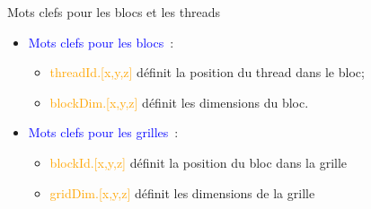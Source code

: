\documentclass[handout,francais]{beamer}
\begin{document}
\begin{frame}[containsverbatim]{Mots clefs pour les blocs et les threads}
\begin{minipage}{5cm}
\begin{itemize}
\item \textcolor{blue}{Mots clefs pour les blocs}~:
  \begin{itemize}
  \item \textcolor{orange}{threadId.[x,y,z]} définit la position du thread dans le bloc;
  \item \textcolor{orange}{blockDim.[x,y,z]} définit les dimensions du bloc.
  \end{itemize}
\item \textcolor{blue}{Mots clefs pour les grilles}~:
  \begin{itemize}
  \item \textcolor{orange}{blockId.[x,y,z]} définit la position du bloc dans la grille
  \item \textcolor{orange}{gridDim.[x,y,z]} définit les dimensions de la grille
  \end{itemize}
\end{itemize}
\end{minipage}
\begin{minipage}[c]{55mm}
\end{minipage}
\end{frame}
\end{document}

